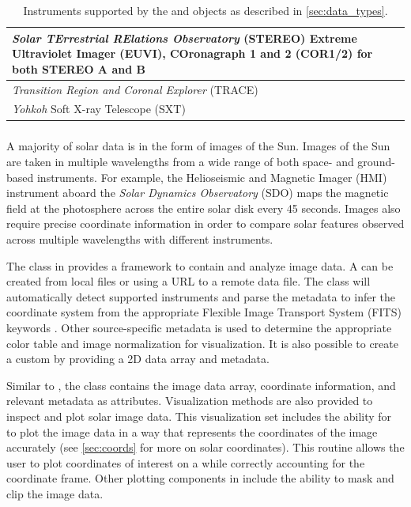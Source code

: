 \begin{table}
\begin{center}
\begin{tabular}{|p{12cm}|c|c|}
\hline
\textit{Solar TErrestrial RElations Observatory} (STEREO) Extreme Ultraviolet Imager (EUVI), COronagraph 1 and 2 (COR1/2) for both STEREO A and B & \citet{howard2008sun} \\
\hline
\textit{Transition Region and Coronal Explorer} (TRACE)  & \citet{handy99}  \\
\hline
\textit{Yohkoh} Soft X-ray Telescope (SXT) & \citet{tsuneta1991soft}  \\
\hline
\end{tabular}
\end{center}
\caption{Instruments supported by the \Timeseries and \Map objects as described in \autoref{sec:data_types}.}
\label{tab:instruments}
\end{table}

\subsubsection{\Map}
\label{sec:map}
A majority of solar data is in the form of images of the Sun.
Images of the Sun are taken in multiple wavelengths from a wide range of both space- and ground- based instruments.
For example, the Helioseismic and Magnetic Imager (HMI) instrument aboard the \textit{Solar Dynamics Observatory} (SDO) maps the magnetic field at the photosphere across the entire solar disk every 45 seconds.
Images also require precise coordinate information in order to compare solar features observed across multiple wavelengths with different instruments.

The \Map class in \sunpypkg provides a framework to contain and analyze image data.
A \Map can be created from local files or using a URL to a remote data file.
The \Map class will automatically detect supported instruments and parse the metadata to infer the coordinate system from the appropriate Flexible Image Transport System (FITS) keywords \citep{refId0, 2006A&A...449..791T}.
Other source-specific metadata is used to determine the appropriate color table and image normalization for visualization.
It is also possible to create a custom \Map by providing a 2D data array and metadata.

Similar to \Timeseries, the \Map class contains the image data array, coordinate information, and relevant metadata as attributes.
Visualization methods are also provided to inspect and plot solar image data.
This visualization set includes the ability for \Map to plot the image data in a way that represents the coordinates of the image accurately (see \autoref{sec:coords} for more on solar coordinates).
This routine allows the user to plot coordinates of interest on a \Map while correctly accounting for the coordinate frame.
Other plotting components in \Map include the ability to mask and clip the image data.

